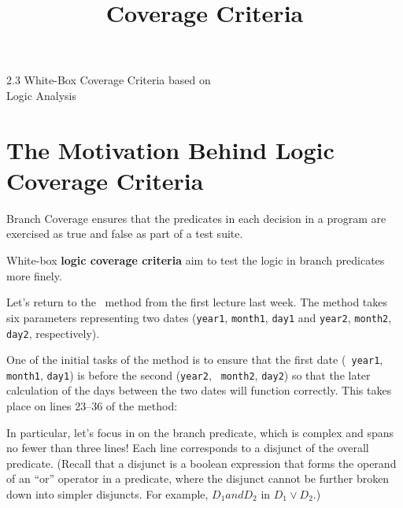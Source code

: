 



\title{Coverage Criteria}{2.3 White-Box Coverage Criteria based on\\ Logic Analysis}

\section{The Motivation Behind Logic Coverage Criteria}


Branch Coverage ensures that the predicates in each decision in a program are
exercised as true and false as part of a test suite. 

White-box {\bf logic coverage criteria} aim to test the logic in branch
predicates more finely.



Let's return to the \daysbetweentwodatesmethod~method from the first lecture
last week. The method takes six parameters representing two dates ({\tt year1},
{\tt month1}, {\tt day1} and {\tt year2}, {\tt month2}, {\tt day2},
respectively).

One of the initial tasks of the method is to ensure that the first date ({\tt
year1}, {\tt month1}, {\tt day1}) is before the second ({\tt year2}, {\tt
month2}, {\tt day2}) so that the later calculation of the days between the two
dates will function correctly. This takes place on lines 23--36 of the method:

\begin{center} 
\end{center}    

In particular, let's focus in on the branch predicate, which is complex and
spans no fewer than three lines! Each line corresponds to a disjunct of the
overall predicate.
%
(Recall that a disjunct is a boolean expression that forms the operand of an
``or'' operator in a predicate, where the disjunct  cannot be further broken
down into simpler disjuncts. For example, $D_1 and D_2$ in $D_1 \vee D_2$.)


